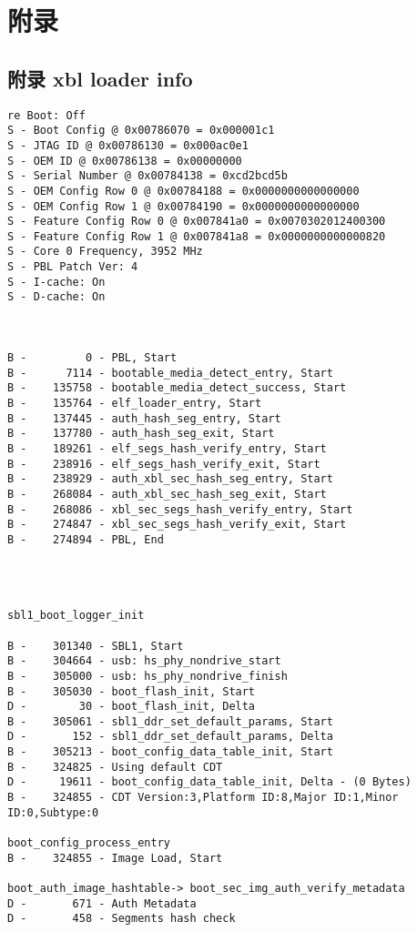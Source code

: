 \chapter{附录}
\section{附录 xbl loader info\label{loaderinfo}}



\begin{lstlisting}
re Boot: Off
S - Boot Config @ 0x00786070 = 0x000001c1
S - JTAG ID @ 0x00786130 = 0x000ac0e1
S - OEM ID @ 0x00786138 = 0x00000000
S - Serial Number @ 0x00784138 = 0xcd2bcd5b
S - OEM Config Row 0 @ 0x00784188 = 0x0000000000000000
S - OEM Config Row 1 @ 0x00784190 = 0x0000000000000000
S - Feature Config Row 0 @ 0x007841a0 = 0x0070302012400300
S - Feature Config Row 1 @ 0x007841a8 = 0x0000000000000820
S - Core 0 Frequency, 3952 MHz
S - PBL Patch Ver: 4
S - I-cache: On
S - D-cache: On



B -         0 - PBL, Start
B -      7114 - bootable_media_detect_entry, Start
B -    135758 - bootable_media_detect_success, Start
B -    135764 - elf_loader_entry, Start
B -    137445 - auth_hash_seg_entry, Start
B -    137780 - auth_hash_seg_exit, Start
B -    189261 - elf_segs_hash_verify_entry, Start
B -    238916 - elf_segs_hash_verify_exit, Start
B -    238929 - auth_xbl_sec_hash_seg_entry, Start
B -    268084 - auth_xbl_sec_hash_seg_exit, Start
B -    268086 - xbl_sec_segs_hash_verify_entry, Start
B -    274847 - xbl_sec_segs_hash_verify_exit, Start
B -    274894 - PBL, End




sbl1_boot_logger_init

B -    301340 - SBL1, Start
B -    304664 - usb: hs_phy_nondrive_start
B -    305000 - usb: hs_phy_nondrive_finish
B -    305030 - boot_flash_init, Start
D -        30 - boot_flash_init, Delta
B -    305061 - sbl1_ddr_set_default_params, Start
D -       152 - sbl1_ddr_set_default_params, Delta
B -    305213 - boot_config_data_table_init, Start
B -    324825 - Using default CDT
D -     19611 - boot_config_data_table_init, Delta - (0 Bytes)
B -    324855 - CDT Version:3,Platform ID:8,Major ID:1,Minor ID:0,Subtype:0

boot_config_process_entry
B -    324855 - Image Load, Start

boot_auth_image_hashtable-> boot_sec_img_auth_verify_metadata
D -       671 - Auth Metadata
D -       458 - Segments hash check


\end{lstlisting}
